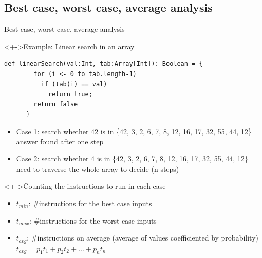 \subsection{Best case, worst case, average analysis}
\begin{frame}{Best case, worst case, average analysis}
  \begin{block}<+->{Example: Linear search in an array}\vspace{-.5\baselineskip}
    \begin{center}      
    \begin{minipage}{.7\linewidth}
    \begin{Verbatim}[frame=single,fontsize=\footnotesize,gobble=6]
      def linearSearch(val:Int, tab:Array[Int]): Boolean = {
        for (i <- 0 to tab.length-1) 
          if (tab(i) == val)
            return true;
        return false
      }
    \end{Verbatim}      
    \end{minipage}
    \end{center}\vspace{-.8\baselineskip}
    \begin{itemize}
    \item Case 1: search whether 42 is in \{42, 3, 2, 6, 7, 8, 12, 16, 17, 32, 55, 44, 12\}\\
      answer found after one step
    \item Case 2: search whether 4 is in \{42, 3, 2, 6, 7, 8, 12, 16, 17, 32, 55, 44, 12\}\\
      need to traverse the whole array to decide (n steps)
    \end{itemize}
  \end{block}\vspace{-.5\baselineskip}

  \begin{block}<+->{Counting the instructions to run in each case}
    \begin{itemize}
    \item $t_{min}$: \#instructions for the best case inputs 
    \item $t_{max}$: \#instructions for the worst case inputs 
    \item $t_{avg}$: \#instructions  on average 
      {\small(average of values coefficiented by probability)}\\
      $t_{avg}=p_1t_1+p_2t_2+\ldots+p_nt_n$
    \end{itemize}
  \end{block}
\end{frame}
